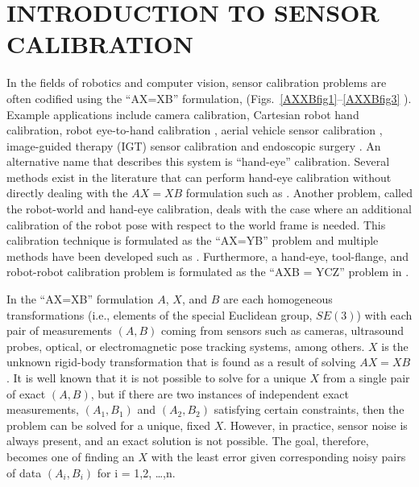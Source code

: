 \documentclass[twocolumn,10pt]{asme2ej}
\begin{document}
\section{INTRODUCTION TO SENSOR CALIBRATION}
In the fields of robotics and computer vision, sensor calibration problems are often codified using the ``AX=XB'' formulation, (Figs.~\ref{AXXBfig1}--\ref{AXXBfig3}%
). Example applications include camera calibration, Cartesian robot hand calibration, robot eye-to-hand calibration \cite{tsai1989new}, aerial vehicle sensor calibration \cite{darius1}, image-guided therapy (IGT) sensor calibration and endoscopic surgery \cite{schmidt2003robust}. {\color{blue} }An alternative name that describes this system is ``hand-eye'' calibration. Several methods exist %
in the literature that can perform hand-eye calibration without directly dealing with the $AX=XB$ formulation such as \cite{malm2000new,heller2012branch,ruland2012globally,wu2014hand,kim,liu2015calibration,manewprob}. %
Another problem, called the robot-world and hand-eye calibration, deals with the case where an additional calibration of the robot pose with respect to the world frame is needed. This calibration technique is formulated as the ``AX=YB'' problem and multiple methods have been developed %
such as \cite{zhuang1994simultaneous,dornaika1998simultaneous,hirsh2001iterative,li2010simultaneous,ernst2012non,heller2014hand,lisimultaneous}.
Furthermore, a hand-eye, tool-flange, and robot-robot calibration problem is formulated as the ``AXB = YCZ'' problem in \cite{wang2014towards,maaxbyczprob}.

In the ``AX=XB'' formulation $A$, $X$, and $B$ are each homogeneous transformations (i.e., elements of the special Euclidean group, $SE(3)$) with each pair of measurements $(A,B)$ coming from sensors such as cameras, ultrasound probes, optical, or electromagnetic pose tracking systems, among others. $X$ is the unknown rigid-body transformation %
that is found as a result of solving $AX=XB$. It is well known that it is not possible to solve for
a unique $X$ from a single pair of exact $(A,B)$, but if there are two instances of independent exact measurements, $(A_1,B_1)$ and $(A_2,B_2)$ satisfying certain constraints,
then the problem can be solved for a unique, fixed $X$. However, in practice, sensor noise is always present, and an exact solution is not possible. The goal, therefore, becomes one of finding
an $X$ with the least error given corresponding noisy pairs of data $(A_i, B_i)$ for i = 1,2, \ldots,n.
\end{document}
